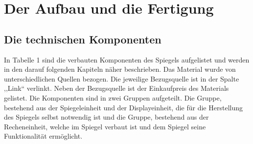 \section{Der Aufbau und die Fertigung}
\label{chapter:kap1}
\subsection{Die technischen Komponenten}
In Tabelle 1 sind die verbauten Komponenten des Spiegels aufgelistet und werden in den darauf folgenden Kapiteln näher beschrieben. Das Material wurde von unterschiedlichen Quellen bezogen. Die jeweilige Bezugsquelle ist in der Spalte ,,Link`` verlinkt. Neben der Bezugsquelle ist der Einkaufpreis des Materials gelistet. Die Komponenten sind in zwei Gruppen aufgeteilt. Die Gruppe, bestehend aus der Spiegeleinheit und der Displayeinheit, die für die Herstellung des Spiegels selbst notwendig ist und die Gruppe, bestehend aus der Recheneinheit, welche im Spiegel verbaut ist und dem Spiegel seine Funktionalität ermöglicht.
